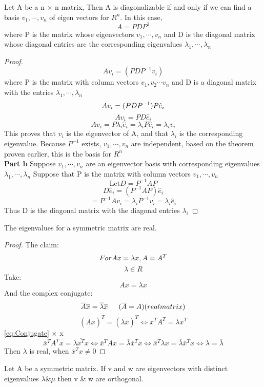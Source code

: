 \documentclass{report}
\begin{document}
\begin{theorem}
   Let A be a n $\times$ n matrix, Then A is diagonalizable if and only if we can find a basis $v_{1},\cdots, v_{n}$ of eigen vectors for $R^{n}$. In this case,
   \begin{equation}
      A = PDP^{1}	
   \end{equation}
   where P is the matrix whose eigenvectors $v_{1},\cdots, v_{n}$ and D is the diagonal matrix whose diagonal entries are the corresponding eigenvalues $\lambda_{1}, \cdots, \lambda_{n}$
\end{theorem}
\begin{proof}
   \[
   Av_{i} = (PDP^{-1}v_{i})
   \]
where P is the matrix with column vectors $v_{1},v_{2} \cdots v_{n}$ and D is a diagonal matrix with the entries $\lambda_{1},\cdots, \lambda_{n}$
\[
Av_i = (PDP^{-1})P \hat{e}_{i} \\
\]
\[
   Av_{i} = PD\hat{e}_i
\]
\[
Av_{i} = P\lambda_{i} \hat{e}_{i} = \lambda_{i} P \hat{e}_{i} = \lambda_i v_{i}
\]
This proves that $v_{i}$ is the eigenvector of A, and that $\lambda_{i}$ is the corresponding eigenvalue.
Because $P^{-1}$ exists, $v_{1},\cdots,v_{n}$ are independent, based on the theorem proven earlier, this is the basis for $R^{n}$ \\
\textbf{Part b}
Suppose $v_{1},\cdots, v_{n}$ are an eigenvector basis with corresponding eigenvalues $\lambda_{1},\cdots,\lambda_{n}$
Suppose that P is the matrix with column vectors $v_{1},\cdots,v_{n}$ \[
   \text{Let} D = P^{-1}AP 
\]
\[
   D \hat{e}_{i} = (P^{-1}AP)\hat{e}_i
\]
\[
   = P^{-1} A v_{i} = \lambda_{i} P^{-1}v_{i} = \lambda_{i} \hat{e}_{i}
\]
Thus D is the diagonal matrix with the diagonal entries $\lambda_{i}$
\end{proof}
%
\begin{theorem}
   The eigenvalues for a symmetric matrix are real.
\end{theorem}
\begin{proof}
   The claim:
	\[
	For \\	Ax = \lambda x, A = A^T \\
	\]
	\[
		\lambda \in R
	\]
	Take:
	\[
		A x = \lambda x
	\]
	And the complex conjugate:
	\[
	   \overline{A}\overline{x} = \overline{\lambda} \overline{x} \indent  (\overline{A} = A)(real \\ matrix)
	\]
\begin{equation}
	   (\overline{A}\overline{x})^T = (\overline{\lambda} \overline{x})^T \iff \overline{x}^T A^T = \overline{\lambda} \overline{x}^T
	\label{eq:Conjugate}
\end{equation}	
\ref{eq:Conjugate} $\times$ x
\[
   \overline{x}^T A^T x = \lambda \overline{x^T} x \iff \overline{x}^T A x = \overline{\lambda} \overline{x}^T x \iff \overline{x}^T \lambda x = \overline{\lambda} \overline{x}^T x \iff \lambda = \overline{\lambda}
\]
Then $\lambda$ is real, when $\overline{x}^T x \neq 0$
\end{proof}
\begin{lemma}
   Let A be a symmetric matrix. If v and w are eigenvectors with distinct eigenvalues $\lambda \& \mu$ then v \& w are orthogonal.
\end{lemma}
\end{document}
